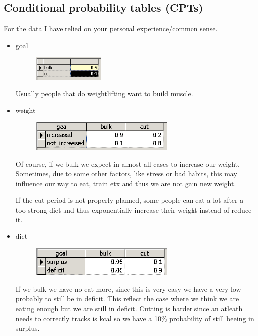 \documentclass[11pt]{article}
\begin{document}
\subsection{Conditional probability tables (CPTs)}
For the data I have relied on your personal experience/common sense.
\begin{itemize}
\item goal
\begin{figure}[H]
\includegraphics[width=0.33\textwidth]{./images/nodes/definitions/1.png}
\end{figure}
Usually people that do weightlifting want to build muscle. 
\item weight
\begin{figure}[H]
\includegraphics[width=0.66\textwidth]{./images/nodes/definitions/2.png}
\end{figure}
Of course, if we bulk we expect in almost all cases to increase our weight. Sometimes, due to some other factors, like stress or bad habits, this may influence our way to eat, train etx and thus we are not gain new weight. 

If the cut period is not properly planned, some people can eat a lot after a too strong diet and thus exponentially increase their weight instead of reduce it.

\item diet
\begin{figure}[H]
\includegraphics[width=0.66\textwidth]{./images/nodes/definitions/3.png}
\end{figure}

If we bulk we have no eat more, since this is very easy  we have a very low probably to still be in deficit. This reflect the case where we think we are eating enough but we are still in deficit. Cutting is harder since an atleath needs to correctly tracks is kcal so we have a 10\% probability of still beeing in surplus.


\end{itemize}
\end{document}
